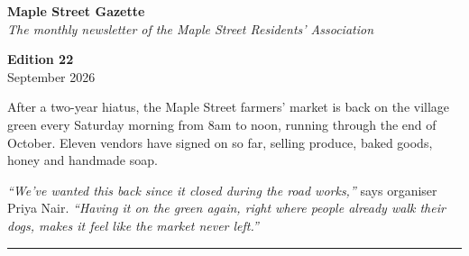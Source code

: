 \documentclass[9pt]{extarticle}
\begin{document}
\noindent
\begin{minipage}{0.68\linewidth}
  {\color{banner}\LARGE\bfseries Maple Street Gazette}\\[2pt]
  {\small\itshape The monthly newsletter of the Maple Street Residents' Association}
\end{minipage}
\hfill
\begin{minipage}{0.28\linewidth}
  \raggedleft
  \small
  \textbf{Edition 22}\\
  September 2026
\end{minipage}

\vspace{2pt}
\noindent{\color{banner}\rule{\linewidth}{1.6pt}}
\vspace{6pt}


\medskip
\noindent
After a two-year hiatus, the Maple Street farmers' market is back on the
village green every Saturday morning from 8am to noon, running through the
end of October. Eleven vendors have signed on so far, selling produce,
baked goods, honey and handmade soap.

\medskip
\noindent\textit{``We've wanted this back since it closed during the road
works,''} says organiser Priya Nair. \textit{``Having it on the green again,
right where people already walk their dogs, makes it feel like the market
never left.''}

\bigskip
\noindent\rule{\linewidth}{0.4pt}
\bigskip
\end{document}
